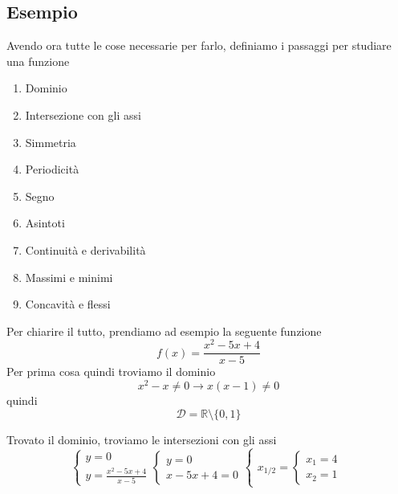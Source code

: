 \subsection{Esempio}
Avendo ora tutte le cose necessarie per farlo, definiamo i passaggi per studiare una funzione
\begin{enumerate}
  \item Dominio
  \item Intersezione con gli assi
  \item Simmetria
  \item Periodicità
  \item Segno
  \item Asintoti
  \item Continuità e derivabilità
  \item Massimi e minimi
  \item Concavità e flessi
\end{enumerate}
Per chiarire il tutto, prendiamo ad esempio la seguente funzione
\begin{equation*}
  f(x) = \frac{x^2-5x+4}{x-5}
\end{equation*}
Per prima cosa quindi troviamo il dominio
\begin{equation*}
  x^2-x\neq0 \rightarrow x(x-1)\neq 0
\end{equation*}
quindi
\begin{equation*}
  \mathcal{D} = \mathbb{R} \setminus \{0,1\}
\end{equation*}
\begin{center}
\end{center}
Trovato il dominio, troviamo le intersezioni con gli assi
\begin{equation*}
  \begin{cases}
    y=0\\
    y = \frac{x^2-5x+4}{x-5}
  \end{cases}
  \begin{cases}
    y = 0\\
    x-5x+4=0
  \end{cases}
  \begin{cases}
    x_{1/2} =
    \begin{cases}
      x_1 = 4\\ x_2=1
    \end{cases}
  \end{cases}
\end{equation*}
